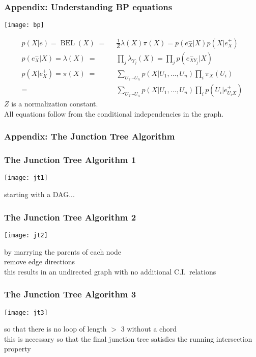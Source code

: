 \begin{frame}
\frametitle{Appendix: Understanding BP equations}

\centerline{\texttt{[image: bp]}}

\begin{eqnarray}
p(X|e)  = \operatorname{BEL}(X)\;=&\;\;\frac{1}{Z}\lambda(X)\pi(X) =
p(e^-_X|X) p(X|e_X^+) \\
p(e^-_X|X) = \lambda(X)\;=&\;\;\prod_j\lambda_{Y_j}(X) =
\prod_j p(e^-_{XY_j}|X) \\
p(X|e^+_X)  = \pi(X)\;=&\;\;\sum_{U_1\cdots
  U_n}p(X|U_1,\ldots,U_n)\prod_i\pi_X(U_i)  \\
=& \;\;\sum_{U_1\cdots
  U_n}p(X|U_1,\ldots,U_n)\prod_i p(U_i|e^+_{U_iX}) 
\end{eqnarray}
$Z$ is a normalization constant.\\
All equations follow from the conditional independencies in the
graph. 

\end{frame}
\begin{frame}
\frametitle{Appendix: The Junction Tree Algorithm}

\end{frame}
\begin{frame}
\frametitle{The Junction Tree Algorithm 1}

\centerline{\texttt{[image: jt1]}}

starting with a DAG...

\end{frame}
\begin{frame}
\frametitle{The Junction Tree Algorithm 2}

\centerline{\texttt{[image: jt2]}}

 by marrying the parents of each node\\
remove edge directions\\
this results in an undirected graph with no additional C.I.\ relations
\end{frame}
\begin{frame}
\frametitle{The Junction Tree Algorithm 3}

\centerline{\texttt{[image: jt3]}}

 so that there is no loop of length $>$ 3 without a
chord\\
this is necessary so that the final junction tree satisfies the
running intersection property
\end{frame}
